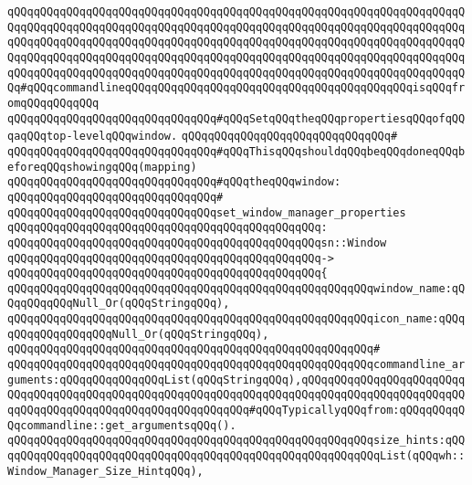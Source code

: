 \newline
\verb|qQQqqQQqqQQqqQQqqQQqqQQqqQQqqQQqqQQqqQQqqQQqqQQqqQQqqQQqqQQqqQQqqQQqqQQqqQQqqQQqqQQqqQQqqQQqqQQqqQQqqQQqqQQqqQQqqQQqqQQqqQQqqQQqqQQqqQQqqQQqqQQqqQQqqQQqqQQqqQQqqQQqqQQqqQQqqQQqqQQqqQQqqQQqqQQqqQQqqQQqqQQqqQQqqQQqqQQqqQQqqQQqqQQqqQQqqQQqqQQqqQQqqQQqqQQqqQQqqQQqqQQqqQQqqQQqqQQqqQQqqQQqqQQqqQQqqQQqqQQqqQQqqQQqqQQqqQQqqQQqqQQqqQQqqQQqqQQqqQQqqQQqqQQqqQQq#qQQqcommandlineqQQqqQQqqQQqqQQqqQQqqQQqqQQqqQQqqQQqqQQqqQQqisqQQqfromqQQqqQQqqQQq|\newline
\verb|qQQqqQQqqQQqqQQqqQQqqQQqqQQqqQQq#qQQqSetqQQqtheqQQqpropertiesqQQqofqQQqaqQQqtop-levelqQQqwindow.|\newline
\verb|qQQqqQQqqQQqqQQqqQQqqQQqqQQqqQQq#|\newline
\verb|qQQqqQQqqQQqqQQqqQQqqQQqqQQqqQQq#qQQqThisqQQqshouldqQQqbeqQQqdoneqQQqbeforeqQQqshowingqQQq(mapping)|\newline
\verb|qQQqqQQqqQQqqQQqqQQqqQQqqQQqqQQq#qQQqtheqQQqwindow:|\newline
\verb|qQQqqQQqqQQqqQQqqQQqqQQqqQQqqQQq#|\newline
\verb|qQQqqQQqqQQqqQQqqQQqqQQqqQQqqQQqset_window_manager_properties|\newline
\verb|qQQqqQQqqQQqqQQqqQQqqQQqqQQqqQQqqQQqqQQqqQQqqQQq:|\newline
\verb|qQQqqQQqqQQqqQQqqQQqqQQqqQQqqQQqqQQqqQQqqQQqqQQqsn::Window|\newline
\verb|qQQqqQQqqQQqqQQqqQQqqQQqqQQqqQQqqQQqqQQqqQQqqQQq->|\newline
\verb|qQQqqQQqqQQqqQQqqQQqqQQqqQQqqQQqqQQqqQQqqQQqqQQq{|\newline
\verb|qQQqqQQqqQQqqQQqqQQqqQQqqQQqqQQqqQQqqQQqqQQqqQQqqQQqqQQqwindow_name:qQQqqQQqqQQqNull_Or(qQQqStringqQQq),|\newline
\verb|qQQqqQQqqQQqqQQqqQQqqQQqqQQqqQQqqQQqqQQqqQQqqQQqqQQqqQQqicon_name:qQQqqQQqqQQqqQQqqQQqNull_Or(qQQqStringqQQq),|\newline
\verb|qQQqqQQqqQQqqQQqqQQqqQQqqQQqqQQqqQQqqQQqqQQqqQQqqQQqqQQq#|\newline
\verb|qQQqqQQqqQQqqQQqqQQqqQQqqQQqqQQqqQQqqQQqqQQqqQQqqQQqqQQqcommandline_arguments:qQQqqQQqqQQqqQQqList(qQQqStringqQQq),qQQqqQQqqQQqqQQqqQQqqQQqqQQqqQQqqQQqqQQqqQQqqQQqqQQqqQQqqQQqqQQqqQQqqQQqqQQqqQQqqQQqqQQqqQQqqQQqqQQqqQQqqQQqqQQqqQQqqQQqqQQqqQQqqQQq#qQQqTypicallyqQQqfrom:qQQqqQQqqQQqcommandline::get_argumentsqQQq().|\newline
\verb|qQQqqQQqqQQqqQQqqQQqqQQqqQQqqQQqqQQqqQQqqQQqqQQqqQQqqQQqsize_hints:qQQqqQQqqQQqqQQqqQQqqQQqqQQqqQQqqQQqqQQqqQQqqQQqqQQqqQQqqQQqList(qQQqwh::Window_Manager_Size_HintqQQq),|\newline
